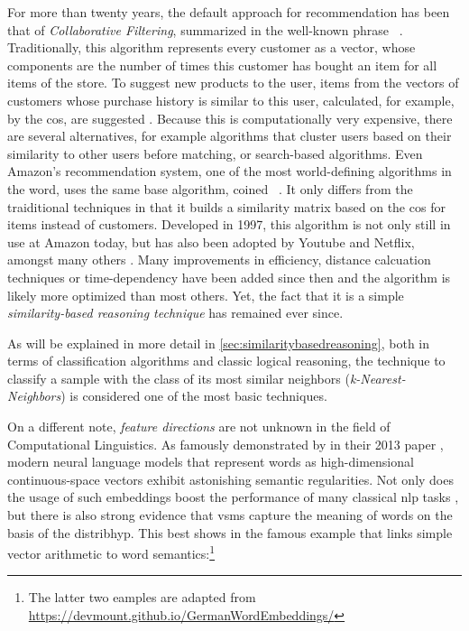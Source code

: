 For more than twenty years, the default approach for recommendation has been that of \emph{Collaborative Filtering}, summarized in the well-known phrase~  \cite{Sarwar2000}. Traditionally, this algorithm represents every customer as a vector, whose components are the number of times this customer has bought an item for all items of the store. To suggest new products to the user, items from the vectors of customers whose purchase history is similar to this user, calculated, for example, by the \gls{cos}, are suggested \cite{Linden2003}. Because this is computationally very expensive, there are several alternatives, for example algorithms that cluster users based on their similarity to other users before matching, or search-based algorithms. Even Amazon's recommendation system, one of the most world-defining algorithms in the word, uses the same base algorithm, coined~ . It only differs from the traiditional techniques in that it builds a similarity matrix based on the \gls{cos} for items instead of customers. Developed in 1997, this algorithm is not only still in use at Amazon today, but has also been adopted by Youtube and Netflix, amongst many others \cite{Smith2017}. Many improvements in efficiency, distance calcuation techniques or time-dependency have been added since then and the algorithm is likely more optimized than most others. Yet, the fact that it is a simple \textit{similarity-based reasoning technique} has remained ever since. 

As will be explained in more detail in \autoref{sec:similaritybasedreasoning}, both in terms of classification algorithms and classic logical reasoning, the technique to classify a sample with the class of its most similar neighbors (\emph{k-Nearest-Neighbors}) is considered one of the most basic techniques.

On a different note, \textit{feature directions} are not unknown in the field of Computational Linguistics. As famously demonstrated by \textcite{Mikolov:Regularities} in their 2013 paper , modern neural language models that represent words as high-dimensional continuous-space vectors exhibit astonishing semantic regularities. Not only does the usage of such embeddings boost the performance of many classical \gls{nlp} tasks \cite{Mikolov2013a,Le2014, Devlin2019}, but there is also strong evidence that \glspl{vsm} capture the meaning of words on the basis of the \gls{distribhyp}. This best shows in the famous example that links simple vector arithmetic to word semantics:\footnote{The latter two eamples are adapted from \url{https://devmount.github.io/GermanWordEmbeddings/}}

